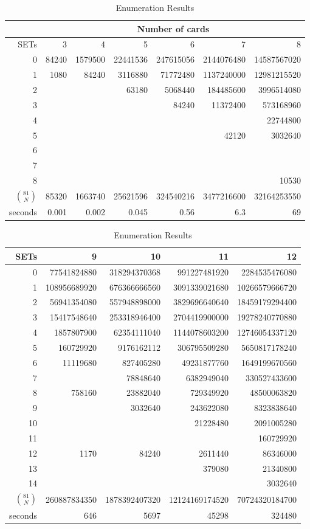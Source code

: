 \documentclass{article}
\begin{document}
\begin{table}
  \caption{Enumeration Results}\label{THE_TABLE}
  \centering
  \begin{tabular}{r | r r r r r r }
    & \multicolumn{6}{c}{Number of cards} \\
    \hline\hline
    SETs & 3 & 4 & 5 & 6 & 7 & 8   \\
    \hline
0  & 84240 & 1579500 & 22441536 & 247615056 & 2144076480 & 14587567020  \\
1  & 1080 & 84240 & 3116880 & 71772480 & 1137240000 & 12981215520 \\
2  &  &  & 63180 & 5068440 & 184485600 & 3996514080 \\
3  &  &  &  & 84240 & 11372400 & 573168960 \\
4  &  &  &  &  &  & 22744800 \\
5  &  &  &  &  & 42120 & 3032640 \\
6  &  &  &  &  &  &  \\
7  &  &  &  &  &  &  \\
8  &  &  &  &  &  & 10530 \\
\hline
$\binom{81}{N}$ & 85320 & 1663740 & 25621596 & 324540216 & 3477216600 & 32164253550  \\
\hline
seconds & 0.001 & 0.002 & 0.045 & 0.56 & 6.3 & 69 
  \end{tabular}

  \vskip 5mm

  \begin{tabular}{r | r r r r }
    SETs & 9 & 10 & 11 & 12 \\
    \hline
0  & 77541824880 & 318294370368 & 991227481920 & 2284535476080 \\
1  & 108956689920 & 676366666560 & 3091339021680 & 10266579666720 \\
2  & 56941354080 & 557948898000 & 3829696640640 & 18459179294400 \\
3  & 15417548640 & 253318946400 & 2704419900000 & 19278240770880 \\
4  & 1857807900 & 62354111040 & 1144078603200 & 12746054337120 \\
5  & 160729920 & 9176162112 & 306795509280 & 5650817178240 \\
6  & 11119680 & 827405280 & 49231877760 & 1649199670560 \\
7  & & 78848640 & 6382949040 & 330527433600 \\
8  & 758160 & 23882040 & 729349920 & 48500063820 \\
9  &  & 3032640 & 243622080 & 8323838640 \\
10 &  &  & 21228480 & 2091005280 \\
11 &  &  & & 160729920 \\
12 & 1170 & 84240 & 2611440 & 86346000 \\
13 &  &  & 379080 & 21340800 \\
14 &  &  &  & 3032640 \\
\hline
$\binom{81}{N}$ & 260887834350 & 1878392407320 & 12124169174520 & 70724320184700 \\
\hline
seconds & 646 & 5697 & 45298 & 324480
  \end{tabular}
\end{table}
\end{document}
